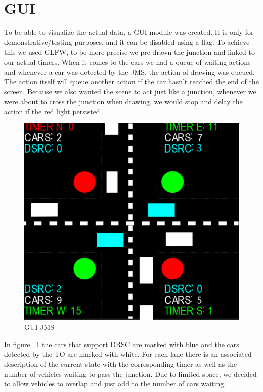 \documentclass[17pt]{report}
\begin{document}
\section{GUI}
\indent \indent
To be able to visualize the actual data, a GUI module was created. 
It is only for demonstrative/testing purposes, and it can be disabled 
using a flag. To achieve this we used GLFW, to be more precise we 
pre drawn the junction and linked to our actual timers. When it comes
to the cars we had a queue of waiting actions and whenever a car
was detected by the JMS, the action of drawing was queued. The action
itself will queue another action if the car hasn't reached the end 
of the screen. Because we also wanted the scene to act just like a 
junction, whenever we were about to cross the junction when drawing, 
we would stop and delay the action if the red light persisted.

\begin{figure}[h!]
    \includegraphics[width=\textwidth]{running/GUI_JMS.png}
    \caption{GUI JMS}
    \label{fig:GUI JMS}
\end{figure}

\indent
In figure ~\ref{fig:GUI JMS} the cars that support DRSC are marked with 
blue and the cars detected by the TO are marked with white. For each
lane there is an associated description of the current state with the  
corresponding timer as well as the number of vehicles waiting to 
pass the junction. Due to limited space, we decided to allow 
vehicles to overlap and just add to the number of cars waiting.
\end{document}
